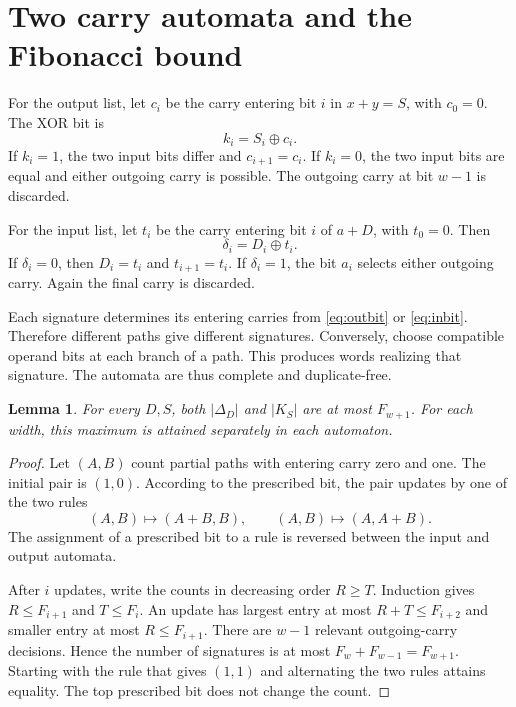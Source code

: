 \documentclass[11pt,a4paper]{article}
\newtheorem{lemma}[theorem]{Lemma}
\theoremstyle{definition}\newtheorem{definition}[theorem]{Definition}
\begin{document}
\section{Two carry automata and the Fibonacci bound}
For the output list, let $c_i$ be the carry entering bit $i$ in $x+y=S$,
with $c_0=0$. The XOR bit is
\begin{equation}\label{eq:outbit}
k_i=S_i\oplus c_i.
\end{equation}
If $k_i=1$, the two input bits differ and $c_{i+1}=c_i$. If $k_i=0$,
the two input bits are equal and either outgoing carry is possible.
The outgoing carry at bit $w-1$ is discarded.

For the input list, let $t_i$ be the carry entering bit $i$ of $a+D$,
with $t_0=0$. Then
\begin{equation}\label{eq:inbit}
\delta_i=D_i\oplus t_i.
\end{equation}
If $\delta_i=0$, then $D_i=t_i$ and $t_{i+1}=t_i$. If $\delta_i=1$,
the bit $a_i$ selects either outgoing carry. Again the final carry is
discarded.

Each signature determines its entering carries from \eqref{eq:outbit}
or \eqref{eq:inbit}. Therefore different paths give different signatures.
Conversely, choose compatible operand bits at each branch of a path.
This produces words realizing that signature. The automata are thus
complete and duplicate-free.

\begin{lemma}\label{lem:fib}
For every $D,S$, both $|\Delta_D|$ and $|K_S|$ are at most $F_{w+1}$.
For each width, this maximum is attained separately in each automaton.
\end{lemma}
\begin{proof}
Let $(A,B)$ count partial paths with entering carry zero and one.
The initial pair is $(1,0)$. According to the prescribed bit, the pair
updates by one of the two rules
\begin{equation}\label{eq:updates}
(A,B)\longmapsto(A+B,B),\qquad
(A,B)\longmapsto(A,A+B).
\end{equation}
The assignment of a prescribed bit to a rule is reversed between the
input and output automata.

After $i$ updates, write the counts in decreasing order $R\geq T$.
Induction gives $R\leq F_{i+1}$ and $T\leq F_i$. An update has largest
entry at most $R+T\leq F_{i+2}$ and smaller entry at most
$R\leq F_{i+1}$. There are $w-1$ relevant outgoing-carry decisions.
Hence the number of signatures is at most $F_w+F_{w-1}=F_{w+1}$.
Starting with the rule that gives $(1,1)$ and alternating the two rules
attains equality. The top prescribed bit does not change the count.
\end{proof}
\end{document}

